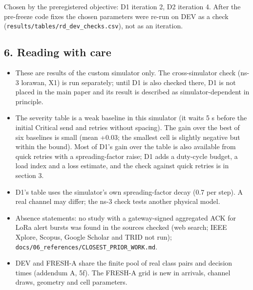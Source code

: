 Chosen by the preregistered objective: D1 iteration 2, D2 iteration 4. After the pre-freeze code fixes the chosen parameters were re-run on DEV as a check (\texttt{results/tables/rd\_dev\_checks.csv}), not as an iteration.

\subsection*{6. Reading with care}

\begin{itemize}
\item These are results of the custom simulator only. The cross-simulator check (ns-3 lorawan, X1) is run separately; until D1 is also checked there, D1 is not placed in the main paper and its result is described as simulator-dependent in principle.
\item The severity table is a weak baseline in this simulator (it waits 5 s before the initial Critical send and retries without spacing). The gain over the best of six baselines is small (mean +0.03; the smallest cell is slightly negative but within the bound). Most of D1's gain over the table is also available from quick retries with a spreading-factor raise; D1 adds a duty-cycle budget, a load index and a loss estimate, and the check against quick retries is in section 3.
\item D1's table uses the simulator's own spreading-factor decay (0.7 per step). A real channel may differ; the ns-3 check tests another physical model.
\item Absence statements: no study with a gateway-signed aggregated ACK for LoRa alert bursts was found in the sources checked (web search; IEEE Xplore, Scopus, Google Scholar and TRID not run); \texttt{docs/06\_references/CLOSEST\_PRIOR\_WORK.md}.
\item DEV and FRESH-A share the finite pool of real class pairs and decision times (addendum A, 5f). The FRESH-A grid is new in arrivals, channel draws, geometry and cell parameters.
\end{itemize}

